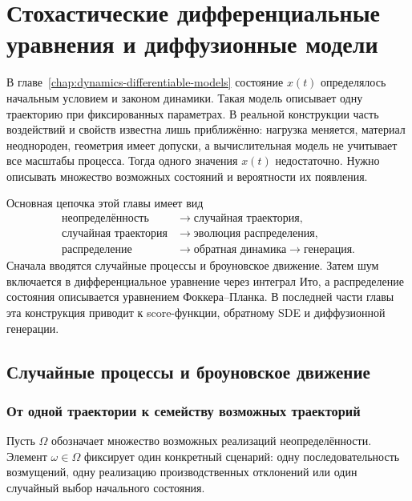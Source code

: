 
\chapter{Стохастические дифференциальные уравнения и диффузионные модели}
\label{chap:stochastic-differential-equations}

В главе~\ref{chap:dynamics-differentiable-models} состояние $x(t)$ определялось начальным условием и законом динамики. Такая модель описывает одну траекторию при фиксированных параметрах. В реальной конструкции часть воздействий и свойств известна лишь приближённо: нагрузка меняется, материал неоднороден, геометрия имеет допуски, а вычислительная модель не учитывает все масштабы процесса. Тогда одного значения $x(t)$ недостаточно. Нужно описывать множество возможных состояний и вероятности их появления.

Основная цепочка этой главы имеет вид
\[
\begin{aligned}
\text{неопределённость}
&\longrightarrow
\text{случайная траектория},\\
\text{случайная траектория}
&\longrightarrow
\text{эволюция распределения},\\
\text{распределение}
&\longrightarrow
\text{обратная динамика}
\longrightarrow
\text{генерация}.
\end{aligned}
\]
Сначала вводятся случайные процессы и броуновское движение. Затем шум включается в дифференциальное уравнение через интеграл Ито, а распределение состояния описывается уравнением Фоккера--Планка. В последней части главы эта конструкция приводит к score-функции, обратному SDE и диффузионной генерации.

\section{Случайные процессы и броуновское движение}
\label{sec:stochastic-processes-brownian-motion}

\subsection{От одной траектории к семейству возможных траекторий}

Пусть $\Omega$ обозначает множество возможных реализаций неопределённости. Элемент $\omega\in\Omega$ фиксирует один конкретный сценарий: одну последовательность возмущений, одну реализацию производственных отклонений или один случайный выбор начального состояния.

